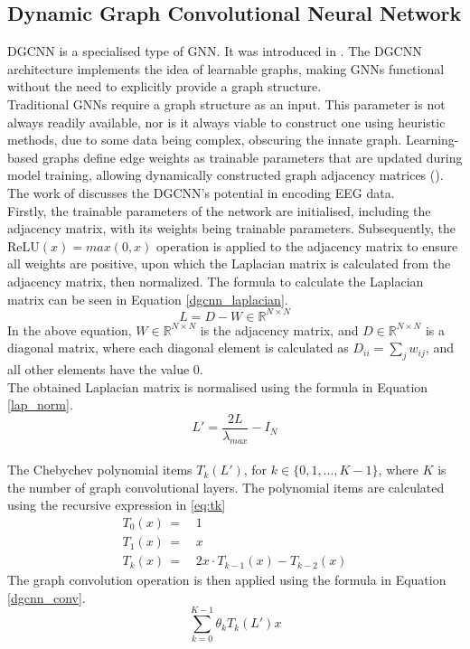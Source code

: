 \subsection{Dynamic Graph Convolutional Neural Network}
DGCNN is a specialised type of GNN. It was introduced in \cite{Song}. The DGCNN architecture implements the idea of learnable graphs, making GNNs functional without the need to explicitly provide a graph structure. 
\vspace{0.5em}\\
Traditional GNNs require a graph structure as an input. This parameter is not always readily available, nor is it always viable to construct one using heuristic methods, 
due to some data being complex, obscuring the innate graph.
Learning-based graphs define edge weights as trainable parameters that are updated during model training, allowing dynamically constructed graph adjacency matrices (\cite{NNSurvey}). The work of \cite{Song} discusses the DGCNN's potential in encoding EEG data.
\vspace{0.5em}\\
Firstly, the trainable parameters of the network are initialised, including the adjacency matrix, with its weights being trainable parameters. Subsequently, the $\text{ReLU}(x) = max(0,x)$ operation is applied to the adjacency matrix to ensure all weights are positive, upon which the Laplacian matrix is calculated from the adjacency matrix, then normalized. The formula to calculate the Laplacian matrix can be seen in Equation \ref{dgcnn_laplacian}.
\begin{equation}\label{dgcnn_laplacian}
    L = D - W \in \mathbb{R}^{N \times N}
\end{equation}
In the above equation, $W \in \mathbb{R}^{N \times N}$ is the adjacency matrix, and $D \in \mathbb{R}^{N \times N}$ is a diagonal matrix, where each diagonal element is calculated as $D_{ii} = \sum_j w_{ij}$, and all other elements have the value $0$.
\vspace{0.5em}\\
The obtained Laplacian matrix is normalised using the formula in Equation \ref{lap_norm}.
\begin{equation}\label{lap_norm}
    L' = \frac{2L}{\lambda_{max}} - I_N
\end{equation}
\vspace{0.5em}\\
The Chebychev polynomial items $T_{k}(L')$, for $k \in \{0,1,...,K-1 \}$, where $K$ is the number of graph convolutional layers. The polynomial items are calculated using the recursive expression in \ref{eq:tk}
\begin{align}
    T_0(x)\,=&\, 1\\
    T_1(x)\,=&\, x\\
    T_k(x)\,=&\, 2x\cdot T_{k-1}(x) - T_{k-2}(x) \label{eq:tk}
\end{align}
The graph convolution operation is then applied using the formula in Equation \ref{dgcnn_conv}.
\begin{equation}\label{dgcnn_conv}
    \sum_{k=0}^{K-1}\theta_kT_k(L')x
\end{equation}

